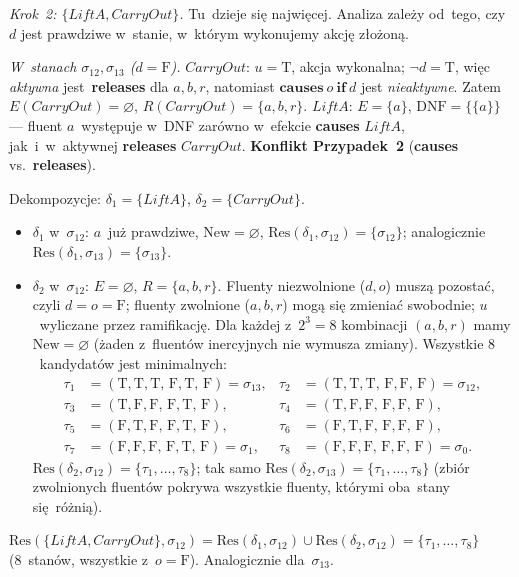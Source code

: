 \documentclass[11pt,a4paper]{article}
\newcommand{\causes}{\textbf{causes}}
\renewcommand{\iff}{\textbf{if}}
\newcommand{\releases}{\textbf{releases}}
\newcommand{\DNF}{\mathrm{DNF}}
\theoremstyle{definition}
\begin{document}
\medskip
\noindent\textit{Krok~2: $\{\mathit{LiftA}, \mathit{CarryOut}\}$.}
Tu~dzieje się najwięcej. Analiza zależy od~tego, czy~$d$ jest prawdziwe
w~stanie, w~którym wykonujemy akcję złożoną.

\smallskip\noindent
\emph{W~stanach $\sigma_{12}, \sigma_{13}$ ($d = \text{F}$).}
$\mathit{CarryOut}$: $u = \text{T}$, akcja wykonalna; $\neg d = \text{T}$,
więc \emph{aktywna} jest~\releases{} dla $a, b, r$, natomiast $\causes\ o\ \iff\ d$
jest \emph{nieaktywne}. Zatem $E(\mathit{CarryOut}) = \varnothing$,
$R(\mathit{CarryOut}) = \{a, b, r\}$.
$\mathit{LiftA}$: $E = \{a\}$, $\DNF = \{\{a\}\}$ --- fluent $a$~występuje
w~DNF zarówno w~efekcie \causes{} $\mathit{LiftA}$, jak~i~w~aktywnej \releases{}
$\mathit{CarryOut}$. \textbf{Konflikt Przypadek~2} (\causes{} vs.~\releases{}).

\smallskip\noindent
Dekompozycje: $\delta_1 = \{\mathit{LiftA}\}$, $\delta_2 = \{\mathit{CarryOut}\}$.
\begin{itemize}[topsep=2pt]
  \item $\delta_1$ w~$\sigma_{12}$: $a$~już prawdziwe, $\mathrm{New} = \varnothing$,
        $\mathrm{Res}(\delta_1, \sigma_{12}) = \{\sigma_{12}\}$; analogicznie
        $\mathrm{Res}(\delta_1, \sigma_{13}) = \{\sigma_{13}\}$.
  \item $\delta_2$ w~$\sigma_{12}$: $E = \varnothing$, $R = \{a, b, r\}$.
        Fluenty nie\-zwolnione ($d, o$) muszą pozostać, czyli $d = o = \text{F}$;
        fluenty zwolnione ($a, b, r$) mogą się zmieniać swobodnie; $u$~wyliczane
        przez ramifikację. Dla każdej z~$2^3 = 8$ kombinacji $(a, b, r)$
        mamy $\mathrm{New} = \varnothing$ (żaden z~fluentów inercyjnych
        nie wymusza zmiany). Wszystkie $8$~kandydatów jest minimalnych:
        \begin{align*}
          \tau_1 &= (\text{T},\text{T},\text{T},\,\text{F},\text{T},\,\text{F}) = \sigma_{13}, &
          \tau_2 &= (\text{T},\text{T},\text{T},\,\text{F},\text{F},\,\text{F}) = \sigma_{12}, \\
          \tau_3 &= (\text{T},\text{F},\text{F},\,\text{F},\text{T},\,\text{F}), &
          \tau_4 &= (\text{T},\text{F},\text{F},\,\text{F},\text{F},\,\text{F}), \\
          \tau_5 &= (\text{F},\text{T},\text{F},\,\text{F},\text{T},\,\text{F}), &
          \tau_6 &= (\text{F},\text{T},\text{F},\,\text{F},\text{F},\,\text{F}), \\
          \tau_7 &= (\text{F},\text{F},\text{F},\,\text{F},\text{T},\,\text{F}) = \sigma_1, &
          \tau_8 &= (\text{F},\text{F},\text{F},\,\text{F},\text{F},\,\text{F}) = \sigma_0.
        \end{align*}
        $\mathrm{Res}(\delta_2, \sigma_{12}) = \{\tau_1, \ldots, \tau_8\}$;
        tak samo $\mathrm{Res}(\delta_2, \sigma_{13}) = \{\tau_1, \ldots, \tau_8\}$
        (zbiór zwolnionych fluentów pokrywa wszystkie fluenty, którymi oba~stany
        się~różnią).
\end{itemize}
$\mathrm{Res}(\{\mathit{LiftA}, \mathit{CarryOut}\}, \sigma_{12}) =
\mathrm{Res}(\delta_1, \sigma_{12}) \cup \mathrm{Res}(\delta_2, \sigma_{12})
= \{\tau_1, \ldots, \tau_8\}$ (8~stanów, wszystkie z~$o = \text{F}$).
Analogicznie dla~$\sigma_{13}$.
\end{document}
